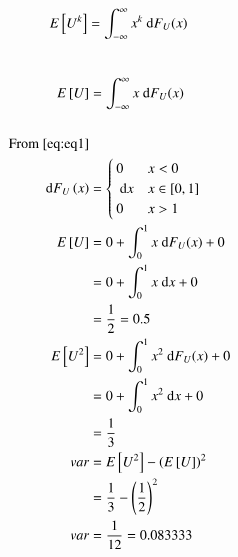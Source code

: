 \documentclass[journal,12pt,twocolumn]{IEEEtran}
\begin{document}
%
\begin{equation}
E{}\left[U^k\right] = \int_{-\infty}^{\infty}x^k ~\mathrm{d}F_{U}(x)
\end{equation}
\solution \\
\begin{align}
    E{}\left[U\right] &= \int_{-\infty}^{\infty}x ~\mathrm{d}F_{U}(x)\\\\
    \text{From} ~\eqref{eq:eq1}\\
   ~\mathrm{d}F_U\left(x\right)&=
                 \begin{cases}
                 0 & x<0\\
                 ~\mathrm{d}x & x\in [0,1]\\
                 0 & x>1
                 \end{cases}\\
    E{}\left[U\right] &= 0+ \int_{0}^{1}x ~\mathrm{d}F_{U}(x)+0  \\
    &=0+\int_{0}^{1}x ~\mathrm{d}x+0\\
    &=\frac{1}{2}=0.5\\
     E{}\left[U^2\right] &= 0+ \int_{0}^{1}x^2 ~\mathrm{d}F_{U}(x)+0  \\
    &=0+\int_{0}^{1}x^2 ~\mathrm{d}x+0\\
    &=\frac{1}{3}\\
    var&=E{}\left[U^2\right]-\left(E{}\left[U\right]\right)^2\\
    &=\frac{1}{3}-\left(\frac{1}{2}\right)^2\\
    var&=\frac{1}{12}=0.083333
\end{align}
\end{document}
